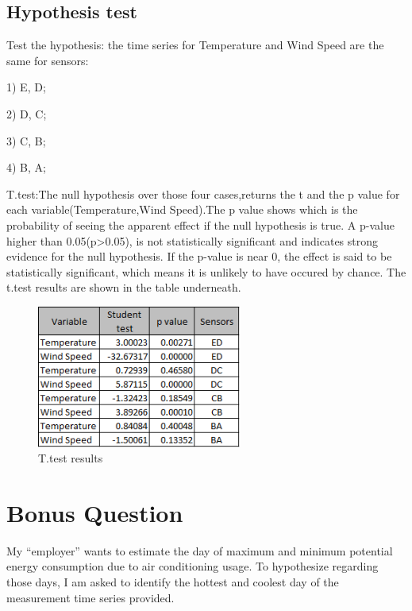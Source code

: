 \documentclass[a4paper,12pt]{article} %
\begin{document}
\subsection{Hypothesis test}
\vspace{5mm}
Test the hypothesis: the time series for Temperature and Wind Speed are the same for sensors:

1) E, D;

2) D, C;

3) C, B;

4) B, A;
\vspace{10mm}

\setlength{\parindent}{8ex}T.test:The null hypothesis over those four cases,returns the t and the p value for each variable(Temperature,Wind Speed).The p value shows which is the probability of seeing the apparent effect if the
null hypothesis is true. A p-value higher than 0.05(p>0.05), is not statistically significant and indicates strong evidence for the null hypothesis. If the p-value is near 0, the effect is said to be statistically significant, which means it is unlikely to have occured by chance. The t.test results are shown in the table underneath.
\vspace{5mm}
\begin{figure}[H]   
	\centering 
	\includegraphics[width=0.6\textwidth]{T_test.png}
	\caption{T.test results} 
\end{figure}
\section{Bonus Question}
\vspace{10mm}
My “employer” wants to estimate the day of maximum and minimum potential energy consumption due to air conditioning usage. To hypothesize regarding those days, I am asked to identify the hottest and coolest day of the measurement time series provided.
\end{document}
